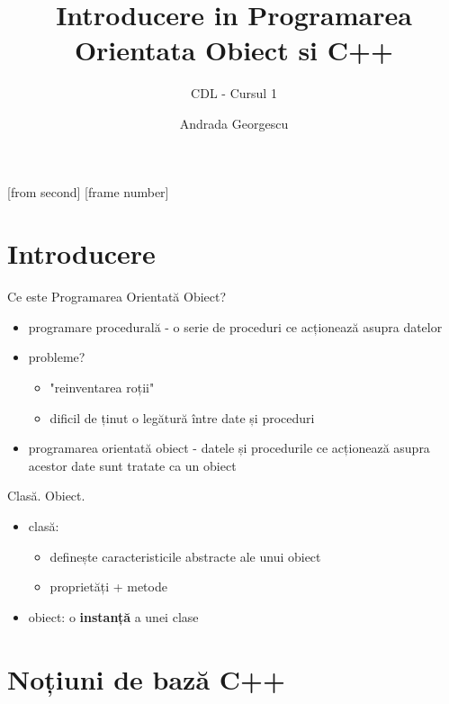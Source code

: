 \documentclass{beamer}
\title[Introducere in POO]{Introducere in Programarea Orientata Obiect si C++}
\subtitle{CDL - Cursul 1}
\institute[ROSEdu]{ROSEdu}
\author[Andrada]{Andrada Georgescu}
\begin{document}
     

[from second]
[frame number]

\frame{\titlepage}

\begin{frame}
\tableofcontents
\end{frame}

\section{Introducere}

\begin{frame}{Ce este Programarea Orientată Obiect?}
  \begin{itemize} %
  \item programare procedurală  - o serie de proceduri ce acționează asupra datelor
  \item probleme? 
  \begin{itemize}  
  	\item "reinventarea roții"
	\item dificil de ținut o legătură între date și proceduri
  \end{itemize}
  \item programarea orientată obiect  - datele și procedurile ce acționează asupra acestor date sunt tratate ca un obiect
  \end{itemize}
\end{frame}   

\begin{frame}{Clasă. Obiect.}
  \begin{itemize}
  \item clasă:
  \begin{itemize}
	\item definește caracteristicile abstracte ale unui obiect	
    \item proprietăți + metode
  \end{itemize}
  \item obiect: o \textbf{instanță} a unei clase %
  \end{itemize}
\end{frame}

\section{Noțiuni de bază C++}
\end{document}
